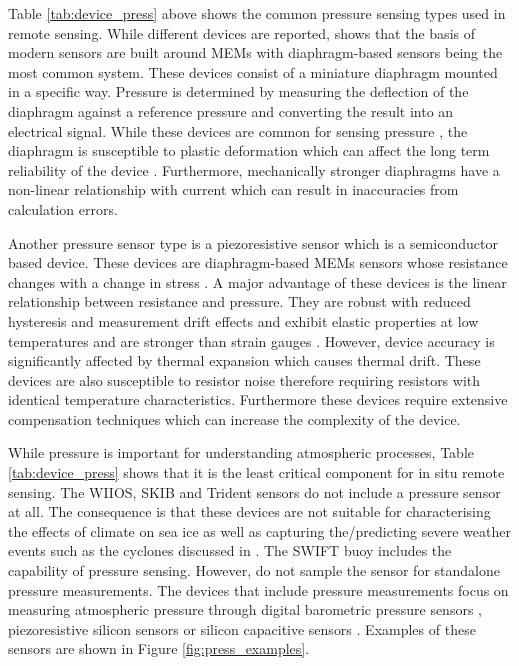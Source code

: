 Table \ref{tab:device_press} above shows the common pressure sensing types used in remote sensing. While different devices are reported, \textcite{eaton1997micromachined} shows that the basis of modern sensors are built around MEMs with diaphragm-based sensors being the most common system. These devices consist of a miniature diaphragm mounted in a specific way. Pressure is determined by measuring the deflection of the diaphragm against a reference pressure and converting the result into an electrical signal. While these devices are common for sensing pressure \cite{eaton1997micromachined}, the diaphragm is susceptible to plastic deformation which can affect the long term reliability of the device \cite{eaton1997micromachined}. Furthermore, mechanically stronger diaphragms have a non-linear relationship with current which can result in inaccuracies from calculation errors. \par  

Another pressure sensor type is a piezoresistive sensor which is a semiconductor based device. These devices are diaphragm-based MEMs sensors whose resistance changes with a change in stress \cite{eaton1997micromachined}. A major advantage of these devices is the linear relationship between resistance and pressure. They are robust with reduced hysteresis and measurement drift effects and exhibit elastic properties at low temperatures and are stronger than strain gauges \cite{eaton1997micromachined}. However, device accuracy is significantly affected by thermal expansion which causes thermal drift. These devices are also susceptible to resistor noise therefore requiring resistors with identical temperature characteristics. Furthermore these devices require extensive compensation techniques which can increase the complexity of the device. \par 


While pressure is important for understanding atmospheric processes, Table \ref{tab:device_press} shows that it is the least critical component for in situ remote sensing. The WIIOS, SKIB and Trident sensors do not include a pressure sensor at all. The consequence is that these devices are not suitable for characterising the effects of climate on sea ice as well as capturing the/predicting severe weather events such as the cyclones discussed in \textcite{vichi2019effects}. The SWIFT buoy includes the capability of pressure sensing. However, do not sample the sensor for standalone pressure measurements. The devices that include pressure measurements focus on measuring atmospheric pressure through digital barometric pressure sensors \cite{rabault2019open,PLANCK2019102792}, piezoresistive silicon sensors \cite{doble2017robust} or silicon capacitive sensors \cite{uptempo}. Examples of these sensors are shown in Figure \ref{fig:press_examples}.

